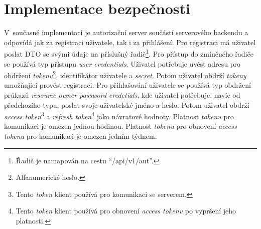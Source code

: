 \section{Implementace bezpečnosti}
        V~současné implementaci je autorizační server součástí serverového backendu a odpovídá jak za registraci uživatele, tak i za přihlášení. Pro registraci má uživatel poslat DTO se svými údaje na příslušný řadič\footnote{Řadič je namapován na cestu \enquote{/api/v1/aut}.}. Pro přístup do zmíněného řadiče se používá typ přístupu \textit{user credentials}. Uživatel potřebuje uvést adresu pro obdržení \textit{tokenu}\footnote{Alfanumerické heslo.}, identifikátor uživatele a \textit{secret}. Potom uživatel obdrží \textit{tokeny} umožňující provést registraci.
        Pro přihlašování uživatele se používá typ obdržení průkazů \textit{resource owner password credetials}, kde uživatel potřebuje, navíc od předchozího typu, poslat svoje uživatelské jméno a heslo. Potom uživatel obdrží \textit{access token}\footnote{Tento \textit{token} klient používá pro komunikaci se serverem.} a \textit{refresh token}\footnote{Tento \textit{token} klient používá pro obnovení \textit{access tokenu} po vypršení jeho platnosti.} jako návratové hodnoty. Platnost \textit{tokenu} pro komunikaci je omezen jednou hodinou. Platnost \textit{tokenu} pro obnovení \textit{access tokenu} pro komunikaci je omezen jedním týdnem.